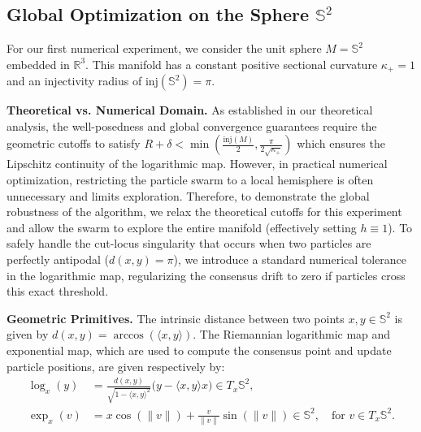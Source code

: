 \documentclass[11pt]{amsart}
\newcommand{\inj}{\mathrm{inj}}%
\begin{document}
\subsection{Global Optimization on the Sphere $\mathbb{S}^2$}
For our first numerical experiment, we consider the unit sphere $M = \mathbb{S}^2$ embedded in $\mathbb{R}^3$. This manifold has a constant positive sectional curvature $\kappa_+ = 1$ and an injectivity radius of $\mathrm{inj}(\mathbb{S}^2) = \pi$. 

\textbf{Theoretical vs. Numerical Domain.}
As established in our theoretical analysis, the well-posedness and global convergence guarantees require the geometric cutoffs to satisfy $R + \delta < \min\left(\frac{\inj(M)}{2},\frac{\pi}{2\sqrt{\kappa_+}}\right)$ which ensures the Lipschitz continuity of the logarithmic map. However, in practical numerical optimization, restricting the particle swarm to a local hemisphere is often unnecessary and limits exploration. Therefore, to demonstrate the global robustness of the algorithm, we relax the theoretical cutoffs for this experiment and allow the swarm to explore the entire manifold (effectively setting $h \equiv 1$). To safely handle the cut-locus singularity that occurs when two particles are perfectly antipodal ($d(x,y) = \pi$), we introduce a standard numerical tolerance in the logarithmic map, regularizing the consensus drift to zero if particles cross this exact threshold.

\textbf{Geometric Primitives.}
The intrinsic distance between two points $x, y \in \mathbb{S}^2$ is given by $d(x,y) = \arccos(\langle x, y \rangle)$. The Riemannian logarithmic map and exponential map, which are used to compute the consensus point and update particle positions, are given respectively by:
\begin{align*}
    \log_x(y) &= \frac{d(x,y)}{\sqrt{1 - \langle x, y \rangle^2}} \big(y - \langle x, y \rangle x\big) \in T_x\mathbb{S}^2, \\
    \exp_x(v) &= x \cos(\|v\|) + \frac{v}{\|v\|} \sin(\|v\|) \in \mathbb{S}^2, \quad \text{for } v \in T_x\mathbb{S}^2.
\end{align*}

\end{document}
